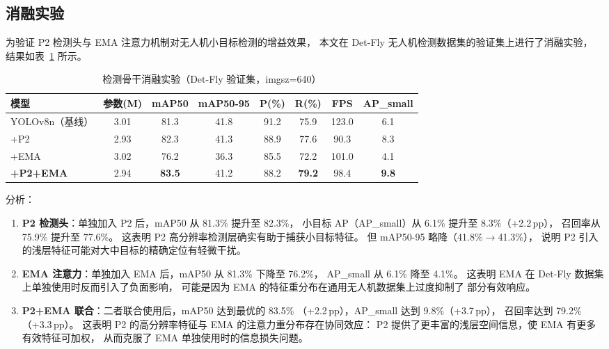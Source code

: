 \documentclass[12pt, a4paper]{ctexart}
\begin{document}
\subsection{消融实验}

为验证 P2 检测头与 EMA 注意力机制对无人机小目标检测的增益效果，
本文在 Det-Fly 无人机检测数据集的验证集上进行了消融实验，
结果如表~\ref{tab:ablation} 所示。

\begin{table}[H]
\centering
\caption{检测骨干消融实验（Det-Fly 验证集，imgsz=640）}
\label{tab:ablation}
\small
\begin{tabular}{lccccccc}
\toprule
\textbf{模型} & \textbf{参数(M)} & \textbf{mAP50} & \textbf{mAP50-95} & \textbf{P(\%)} & \textbf{R(\%)} & \textbf{FPS} & \textbf{AP\_small} \\
\midrule
YOLOv8n（基线） & 3.01 & 81.3 & 41.8 & 91.2 & 75.9 & 123.0 & 6.1 \\
\quad+P2 & 2.93 & 82.3 & 41.3 & 88.9 & 77.6 & 90.3 & 8.3 \\
\quad+EMA & 3.02 & 76.2 & 36.3 & 85.5 & 72.2 & 101.0 & 4.1 \\
\quad\textbf{+P2+EMA} & 2.94 & \textbf{83.5} & 41.2 & 88.2 & \textbf{79.2} & 98.4 & \textbf{9.8} \\
\bottomrule
\end{tabular}
\end{table}

分析：

\begin{enumerate}
  \item \textbf{P2 检测头}：单独加入 P2 后，mAP50 从 81.3\% 提升至 82.3\%，
        小目标 AP（AP\_small）从 6.1\% 提升至 8.3\%（+2.2\,pp），
        召回率从 75.9\% 提升至 77.6\%。
        这表明 P2 高分辨率检测层确实有助于捕获小目标特征。
        但 mAP50-95 略降（41.8\%$\rightarrow$41.3\%），
        说明 P2 引入的浅层特征可能对大中目标的精确定位有轻微干扰。

  \item \textbf{EMA 注意力}：单独加入 EMA 后，mAP50 从 81.3\% 下降至 76.2\%，
        AP\_small 从 6.1\% 降至 4.1\%。
        这表明 EMA 在 Det-Fly 数据集上单独使用时反而引入了负面影响，
        可能是因为 EMA 的特征重分布在通用无人机数据集上过度抑制了
        部分有效响应。

  \item \textbf{P2+EMA 联合}：二者联合使用后，mAP50 达到最优的 83.5\%
        （+2.2\,pp），AP\_small 达到 9.8\%（+3.7\,pp），
        召回率达到 79.2\%（+3.3\,pp）。
        这表明 P2 的高分辨率特征与 EMA 的注意力重分布存在协同效应：
        P2 提供了更丰富的浅层空间信息，使 EMA 有更多有效特征可加权，
        从而克服了 EMA 单独使用时的信息损失问题。
\end{enumerate}
\end{document}
